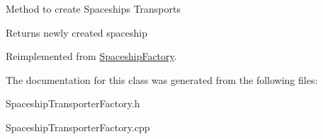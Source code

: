 Method to create Spaceships Transports \begin{DoxyReturn}{Returns}
newly created spaceship 
\end{DoxyReturn}


Reimplemented from \hyperlink{classSpaceshipFactory_a146f5e82385a55e9bf4ce63e28f99a9d}{Spaceship\+Factory}.



The documentation for this class was generated from the following files\+:\begin{DoxyCompactItemize}
\item 
Spaceship\+Transporter\+Factory.\+h\item 
Spaceship\+Transporter\+Factory.\+cpp\end{DoxyCompactItemize}
